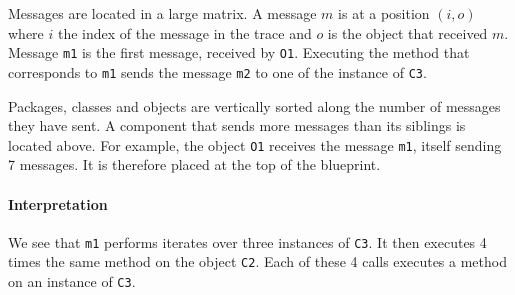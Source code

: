\documentclass{sig-alternate}
\newcommand{\ct}{\lstinline[backgroundcolor=\color{white},basicstyle=\footnotesize\ttfamily]}
\newcommand{\figref}[1]{Figure~\ref{fig:#1}}
\begin{document}
Messages are located in a large matrix. A message $m$ is at a position $(i,o)$ where $i$ the index of the message in the trace and $o$ is the object that received $m$. Message \ct{m1} is the first message, received by \ct{O1}. Executing the method that corresponds to \ct{m1} sends the message \ct{m2} to one of the instance of \ct{C3}. 

Packages, classes and objects are vertically sorted along the number of messages they have sent. A component that sends more messages than its siblings is located above. For example, the object \ct{O1} receives the message \ct{m1}, itself sending 7 messages. It is therefore placed at the top of the blueprint. 

\paragraph{Interpretation}
We see that \ct{m1} performs iterates over three instances of \ct{C3}. It then executes 4 times the same method on the object \ct{C2}. Each of these 4 calls  executes a method on an instance of \ct{C3}.


%
%
%
%
\end{document}

